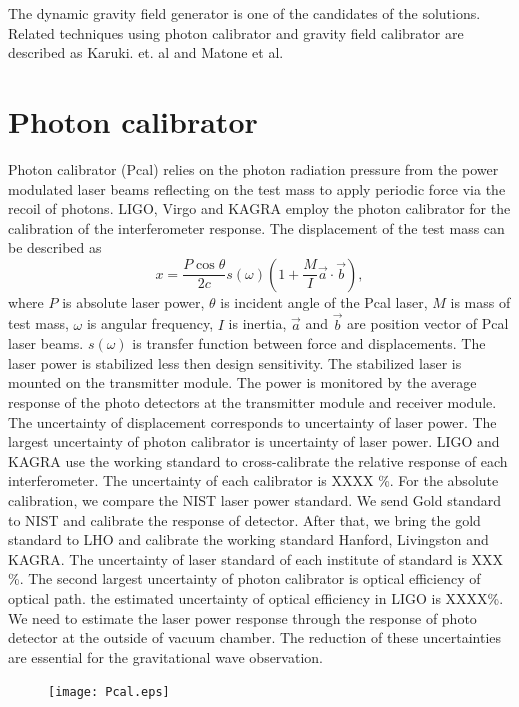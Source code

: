 \documentclass[12pt]{iopart}
\begin{document}
The dynamic gravity field generator is one of the candidates of the solutions. Related techniques using photon calibrator and gravity field calibrator are described as Karuki. et. al and Matone et al.

\section{Photon calibrator}
Photon calibrator (Pcal) relies on the photon radiation pressure from the power modulated laser beams reflecting on the test mass to apply periodic force via the recoil of photons. 
LIGO, Virgo and KAGRA employ the photon calibrator for the calibration of the interferometer response. The displacement of the test mass can be described as
\begin{equation}
 x = \frac{P \cos{\theta}}{2c} s(\omega)\left(1+\frac{M}{I}\vec{a} \cdot \vec{b} \right) , \label{pcal}
\end{equation}
where $P$ is absolute laser power, $\theta$ is incident angle of the Pcal laser, $M$ is mass of test mass, $\omega$ is angular frequency, $I$ is inertia, $\vec{a}$ and $\vec{b}$ are position vector of Pcal laser beams. $s(\omega)$ is transfer function between force and displacements. The laser power is stabilized less then design sensitivity. The stabilized laser is mounted on the transmitter module. The power is monitored by the average response of the photo detectors at the transmitter module and receiver module.  The uncertainty of displacement corresponds to uncertainty of laser power. 
The largest uncertainty of photon calibrator is uncertainty of laser power.
LIGO and KAGRA use the working standard to cross-calibrate the relative response of each interferometer. The uncertainty of  each  calibrator is XXXX \%. For the absolute calibration, we compare the NIST laser power standard. We send Gold standard to NIST and calibrate the response of detector. After that, we bring the gold standard to LHO and calibrate the working standard Hanford, Livingston and KAGRA. The uncertainty of laser standard of each institute of standard is XXX \%. 
The second largest uncertainty of photon calibrator is optical efficiency of optical path. the estimated uncertainty of optical efficiency in LIGO is XXXX\%. We need to estimate the laser power response through the response of photo detector at the outside of vacuum chamber. 
The reduction of these uncertainties are essential for the gravitational wave observation.

\begin{figure}
\begin{center}
\texttt{[image: Pcal.eps]}
\caption{}
\label{fig:Pcal}
\end{center}
\end{figure}
\end{document}
